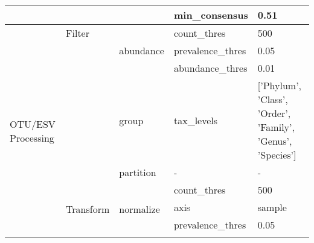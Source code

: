 \begin{table}[]
{\begin{tabular}{|l|l|l|l|l|}
                                          &                                                           &                                        & min\_consensus                         & 0.51                                                           \\ \hline
\multirow{12}{*}{OTU/ESV Processing}      & Filter                                                    & \multirow{3}{*}{abundance}             & count\_thres                           & 500                                                            \\ \cline{2-2} \cline{4-5}
                                          &                                                           &                                        & prevalence\_thres                      & 0.05                                                           \\ \cline{2-2} \cline{4-5}
                                          &                                                           &                                        & abundance\_thres                       & 0.01                                                           \\ \cline{2-5}
                                          &                                                           & group                                  & tax\_levels                            & {[}'Phylum', 'Class', 'Order', 'Family', 'Genus', 'Species'{]} \\ \cline{2-5}
                                          &                                                           & partition                              & -                                      & -                                                              \\ \cline{2-5}
                                          & \multirow{6}{*}{Transform}                                & \multirow{6}{*}{normalize}             & count\_thres                           & 500                                                            \\ \cline{4-5}
                                          &                                                           &                                        & axis                                   & sample                                                         \\ \cline{4-5}
                                          &                                                           &                                        & prevalence\_thres                      & 0.05                                                           \\ \cline{4-5}

\end{tabular}}
\end{table}

